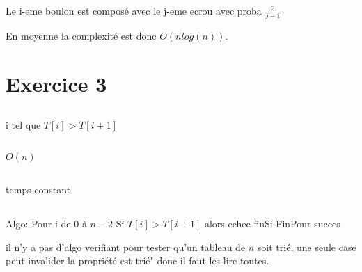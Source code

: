 \documentclass[a4paper]{article}
\begin{document}
Le i-eme boulon est composé avec le j-eme ecrou avec proba $\frac{2}{j-1}$

En moyenne la complexité est donc $O(n log(n))$.

\section{Exercice 3}
\subsection{}
i tel que $T[i] > T[i+1]$
\subsection{}
$O(n)$
\subsection{}
temps constant
\subsection{}
Algo:
Pour i de 0 à $n-2$ 
Si $T[i] > T[i+1]$ alors echec finSi
FinPour
succes 

il n'y a pas d'algo verifiant pour tester qu'un tableau de $n$ soit trié, une seule case peut invalider la propriété est trié" donc il faut les lire toutes.
\end{document}
